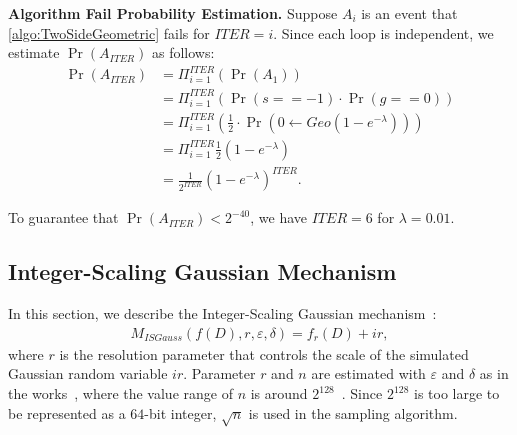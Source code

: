 \textbf{Algorithm Fail Probability Estimation. }
Suppose $A_i$ is an event that \autoref{algo:TwoSideGeometric} fails for $ITER=i$.
Since each loop is independent, we estimate $\Pr\left(A_{ITER}\right)$ as follows:
\begin{equation}
    \begin{split}
        \Pr\left(A_{ITER}\right) & = \Pi _{i=1}^{ITER}\left(\Pr\left(A_1\right) \right) \\
        &= \Pi _{i=1}^{ITER} \left(\Pr\left(s==-1\right)\cdot  \Pr\left(g==0\right) \right)\\
        &=       \Pi _{i=1}^{ITER} \left(\frac{1}{2}\cdot \Pr\left(0\gets Geo\left( 1-e^{-\lambda}  \right) \right)  \right)                   \\
        &= \Pi _{i=1}^{ITER} \frac{1}{2}  \left(1-e^{-\lambda}\right) \\
        &= \frac{1}{2^{ITER}}  \left(1-e^{-\lambda}\right)^{ITER}.
    \end{split}
\end{equation}

To guarantee that $\Pr\left(A_{ITER}\right)<2^{-40}$, we have $ITER = 6$ for $\lambda = 0.01$.




\subsection{Integer-Scaling Gaussian Mechanism}
\label{subsec:IntegerScalingGaussianMechanism}
In this section, we describe the Integer-Scaling Gaussian mechanism~\cite{googleDP2019}:
\begin{equation}
    \begin{split}
        M_{ISGauss}\left(f\left(D\right),r,\varepsilon,\delta\right)=f_r\left(D\right) +ir,
    \end{split}
\end{equation}
where $r$ is the resolution parameter that controls the scale of the simulated Gaussian random variable $ir$. Parameter $r$ and $n$ are estimated with $\varepsilon$ and $\delta$ as in the works~\cite{balle2018improving,googleDP2019}, where the value range of $n$ is around $2^{128}$~\cite{googleDP2019}. Since $2^{128}$ is too large to be represented as a $64$-bit integer, $\sqrt{n}$ is used in the sampling algorithm.

